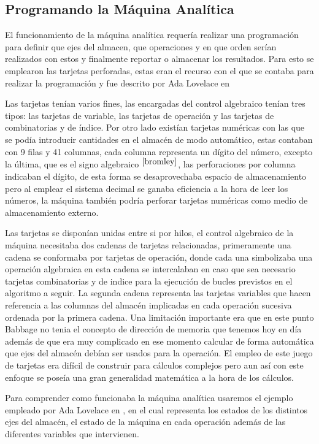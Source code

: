 \documentclass[runningheads,a4paper]{llncs}
\begin{document}
\subsection*{Programando la Máquina Analítica}

El funcionamiento de la máquina analítica requería realizar una programación para definir que ejes del almacen, que operaciones y en que orden serían realizados con estos y finalmente reportar o almacenar los resultados. Para esto se
emplearon las tarjetas perforadas, estas eran el recurso con el que se contaba para realizar la programación y fue descrito por Ada Lovelace en \cite{lovelace}

Las tarjetas tenían varios fines, las encargadas del control algebraico tenían tres tipos: las tarjetas de variable, las tarjetas de operación y las tarjetas de combinatorias y de índice. Por otro lado existían tarjetas numéricas con las que se podía introducir cantidades en el almacén de modo automático, estas contaban con 9 filas y 41 columnas, cada columna representa un dígito del número, excepto la última, que es el signo algebraico $^{\cite{bromley}}$, las perforaciones por columna indicaban el dígito, de esta forma se desaprovechaba espacio de almacenamiento pero al emplear el sistema decimal se ganaba eficiencia a la hora de leer los números, la máquina también podría perforar tarjetas numéricas como medio de almacenamiento externo.

Las tarjetas se disponían unidas entre si por hilos, el control algebraico de la máquina necesitaba dos cadenas de
tarjetas relacionadas, primeramente una cadena se conformaba por tarjetas de operación, donde cada una simbolizaba una
operación algebraica en esta cadena se intercalaban en caso que sea necesario tarjetas combinatorias y de indice para 
la ejecución de bucles previstos en el algoritmo a seguir. La segunda cadena representa las tarjetas variables que hacen referencia a las columnas del almacén implicadas en cada operación sucesiva ordenada por la primera cadena. Una
limitación importante era que en este punto Babbage no tenia el concepto de dirección de memoria que tenemos hoy en día
además de que era muy complicado en ese momento calcular de forma automática que ejes del almacén debían ser usados 
para la operación. El empleo de este juego de tarjetas era difícil de construir para cálculos complejos pero aun así
con este enfoque se poseía una gran generalidad matemática a la hora de los cálculos.

Para comprender como funcionaba la máquina analítica usaremos el ejemplo empleado por Ada Lovelace en \cite{lovelace}, en el cual representa los estados de los distintos ejes del almacén, el estado de la máquina en cada operación además de las diferentes variables que intervienen.
\end{document}
